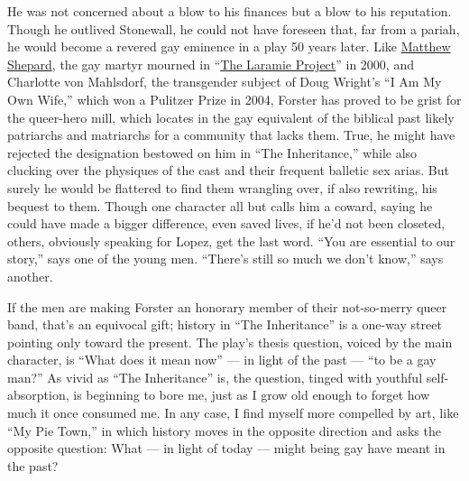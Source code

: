 He was not concerned about a blow to his finances but a blow to his
reputation. Though he outlived Stonewall, he could not have foreseen
that, far from a pariah, he would become a revered gay eminence in a
play 50 years later. Like
\href{https://www.nytimes3xbfgragh.onion/topic/person/matthew-shepard}{Matthew
Shepard}, the gay martyr mourned in
``\href{https://www.nytimes3xbfgragh.onion/2009/08/04/theater/04theater.html}{The
Laramie Project}'' in 2000, and Charlotte von Mahlsdorf, the transgender
subject of Doug Wright's ``I Am My Own Wife,'' which won a Pulitzer
Prize in 2004, Forster has proved to be grist for the queer-hero mill,
which locates in the gay equivalent of the biblical past likely
patriarchs and matriarchs for a community that lacks them. True, he
might have rejected the designation bestowed on him in ``The
Inheritance,'' while also clucking over the physiques of the cast and
their frequent balletic sex arias. But surely he would be flattered to
find them wrangling over, if also rewriting, his bequest to them. Though
one character all but calls him a coward, saying he could have made a
bigger difference, even saved lives, if he'd not been closeted, others,
obviously speaking for Lopez, get the last word. ``You are essential to
our story,'' says one of the young men. ``There's still so much we don't
know,'' says another.

If the men are making Forster an honorary member of their not-so-merry
queer band, that's an equivocal gift; history in ``The Inheritance'' is
a one-way street pointing only toward the present. The play's thesis
question, voiced by the main character, is ``What does it mean now'' ---
in light of the past --- ``to be a gay man?'' As vivid as ``The
Inheritance'' is, the question, tinged with youthful self-absorption, is
beginning to bore me, just as I grow old enough to forget how much it
once consumed me. In any case, I find myself more compelled by art, like
``My Pie Town,'' in which history moves in the opposite direction and
asks the opposite question: What --- in light of today --- might being
gay have meant in the past?

